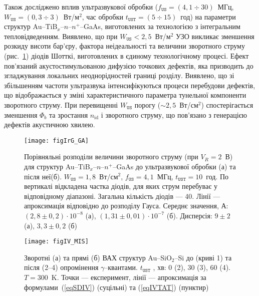 Також досліджено вплив ультразвукової обробки
($f_\mathtt{US}=(4,1\div30)$~МГц, $W_\mathtt{US}=(0,3\div3)$~Вт/м$^2$, час обробки $t_\mathtt{UST}=(5\div15)$~год) на параметри структур
Au--TiB$_x$--$n$--$n^+$--GaAs, виготовлених
за технологією з інтегральним тепловідведенням.
Виявлено, що при $W_\mathtt{US}<2,5$~Вт/м$^2$ УЗО викликає зменшення розкиду висоти бар'єру, фактора неідеальності та величини зворотного струму (рис.~\ref{figIrG_GA})
діодів Шотткі, виготовлених в єдиному технологічному процесі.
Ефект пов'язаний акустостимульованою дифузією точкових дефектів, яка призводить до згладжування локальних неоднорідностей границі розділу.
Виявлено, що зі збільшенням частоти ультразвука інтенсифікуються процеси перебудови дефектів, що відображається у зміні характеристичного  параметра тунельної компоненти зворотного
струму.
При перевищенні $W_\mathtt{US}$ порогу ($\sim2,5$~Вт/см$^2$) спостерігається зменшення $\Phi_b$ та зростання $n_\mathrm{id}$ і зворотного струму, що пов'язано з генерацією дефектів акустичною хвилею.

\begin{figure}
\center
\texttt{[image: figIrG\_GA]}%
\caption{\label{figIrG_GA}
Порівняльні розподіли величини зворотного струму (при $V_R=2$~В)
для структур Au--TiB$_x$--$n$--$n^+$--GaAs до ультразвукової обробки (а) та після неї(б).
$W_\mathtt{US}=1,8$~Вт/см$^2$, $f_\mathtt{US}=4,1$~МГц, $t_\mathtt{UST}=10$~год.
По вертикалі відкладена частка діодів, для яких струм перебуває у відповідному діапазоні.
Загальна кількість діодів --- 40.
Лінії --- апроксимація відповідно до розподілу Гауса.
Середнє значення, А:
$(2,8\pm0,2)\cdot10^{-8}$ (а),
$(1,31\pm0,01)\cdot10^{-7}$ (б).
Дисперсія:
$9\pm2$ (а),
$3,3\pm0,2$ (б)
\vspace{1em}
}
\end{figure}

\begin{figure}[t]
\center
\texttt{[image: figIV\_MIS]}%
\caption{\label{figIV_MIS}
Зворотні (а) та прямі (б) ВАХ структур Au--SiO$_2$--Si до (криві 1)
та після (2--4) опромінення $\gamma$--квантами.
$t_\mathtt{UST}$ , хв: 0 (2), 30 (3), 60 (4).
$T=300$~K.
Точки --- експеримент,
лінії --- апроксимація за формулами~(\ref{eqSDIV}) (суцільні) та (\ref{eqIVTAT}) (пунктир)
\vspace{1em}
}%
\end{figure}

